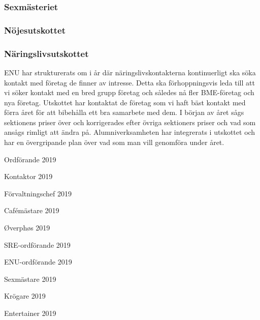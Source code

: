 \documentclass[../_main/handlingar.tex]{subfiles}
\begin{document}
\subsubsection*{Sexmästeriet}

\subsubsection*{Nöjesutskottet}

\subsubsection*{Näringslivsutskottet}

ENU har strukturerats om i år där näringslivskontakterna kontinuerligt ska söka kontakt med företag de finner av intresse. Detta ska förhoppningsvis leda till att vi söker kontakt med en bred grupp företag och således nå fler BME-företag och nya företag. Utskottet har kontaktat de företag som vi haft bäst kontakt med förra året för att bibehålla ett bra samarbete med dem. I början av året sågs sektionens priser över och korrigerades efter övriga sektioners priser och vad som ansågs rimligt att ändra på. Alumniverksamheten har integrerats i utskottet och har en övergripande plan över vad som man vill genomföra under året.

\newpage
\begin{signatures}{10}
    \mvh
   \signature{\ordf}{Ordförande 2019}
   \signature{\sekr}{Kontaktor 2019}
   \signature{\fvc}{Förvaltningschef 2019}
    \signature{\cafem}{Cafémästare 2019}
    \signature{\ophos}{Øverphøs 2019}
    \signature{\sreordf}{SRE-ordförande 2019}
    \signature{\enuordf}{ENU-ordförande 2019}
    \signature{\sexm}{Sexmästare 2019}
    \signature{\krog}{Krögare 2019}
    \signature{\ent}{Entertainer 2019}
\end{signatures}
\end{document}
